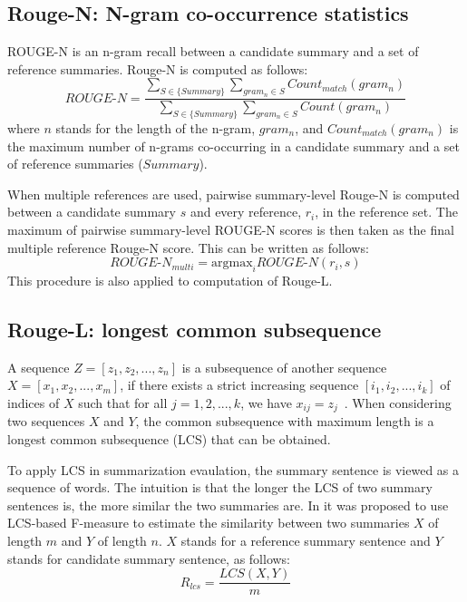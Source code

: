 \subsection*{Rouge-N: N-gram co-occurrence statistics}
ROUGE-N is an n-gram recall between a candidate summary and a set of reference summaries. Rouge-N is computed as follows:
\begin{equation}
    ROUGE\text{-}N = \frac{\sum\limits_{S \in \{Summary\}} \sum\limits_{gram_n \in S} Count_{match}(gram_n)}{\sum\limits_{S \in \{Summary\}} \sum\limits_{gram_n \in S} Count(gram_n)}
\end{equation}
where $n$ stands for the length of the n-gram, $gram_n$, and $Count_{match}(gram_n)$ is the maximum number of n-grams co-occurring in a candidate summary and a set of reference summaries ($Summary$).

When multiple references are used, pairwise summary-level Rouge-N is computed between a candidate summary $s$ and every reference, $r_i$, in the reference set. The maximum of pairwise summary-level ROUGE-N scores is then taken as the final multiple reference Rouge-N score. This can be written as follows:
\begin{equation}
    ROUGE\text{-}N_{multi} = \text{argmax}_i ROUGE\text{-}N(r_i,s) 
\end{equation}
This procedure is also applied to computation of Rouge-L.
\subsection*{Rouge-L: longest common subsequence}
A sequence $Z = [z_1, z_2, ..., z_n]$ is a subsequence of another sequence $X = [x_1 , x_2 , ..., x_m ]$, if there exists a strict increasing sequence $[i_1, i_2, ..., i_k]$ of indices of $X$ such that for all $j=1,2,...,k$, we have $x_{ij}=z_j$~\cite{rouge_book}. When considering two sequences $X$ and $Y$, the common subsequence with maximum length is a longest common subsequence (LCS) that can be obtained.

To apply LCS in summarization evaulation, the summary sentence is viewed as a sequence of words. The intuition is that the longer the LCS of two summary sentences is, the more similar the two summaries are. In it was proposed to use LCS-based F-measure to estimate the similarity between two summaries $X$ of length $m$ and $Y$ of length $n$. $X$ stands for a reference summary sentence and $Y$ stands for candidate summary sentence, as follows: 
\begin{equation}
    R_{lcs} = \frac{LCS(X,Y)}{m}
\end{equation}

